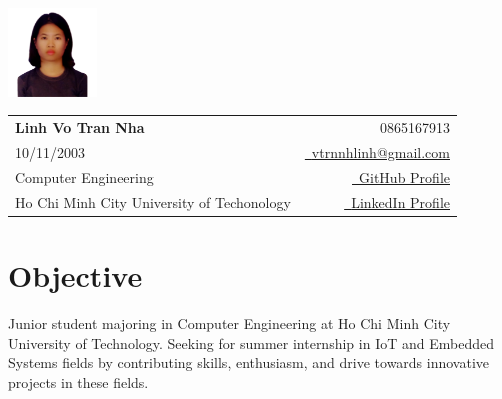 \documentclass[a4paper,11pt]{article}
\makeatletter
\newcommand{\name}{Linh Vo Tran Nha} %
\newcommand{\phone}{0865167913} %
\newcommand{\emailb}{vtrnnhlinh@gmail.com} %
\newcommand{\dob}{10/11/2003} %
\makeatother
\begin{document}
\selectfont


\parbox{2.35cm}{%
  \includegraphics[width=2.35cm,clip]{avatar.png}
}
\parbox{\dimexpr\linewidth-2.8cm\relax}{
  \begin{tabularx}{\linewidth}{L r}                                                                                                                                                   \\
    \textbf{\Large \name}                        & {\raisebox{0.0\height}{\footnotesize \faPhone}\ \phone}                                                              \\
    \dob                                         & \href{mailto:\emailb}{\raisebox{0.0\height}{\footnotesize \faEnvelope}\ {\emailb}}                                   \\
    {Computer Engineering}                       & \href{https://github.com/vtrnnhlinh}{\raisebox{0.0\height}{\footnotesize \faGithub}\ {GitHub Profile}}               \\
    {Ho Chi Minh City University of Techonology} & \href{https://www.linkedin.com/in/vtrnnhlinh/}{\raisebox{0.0\height}{\footnotesize \faLinkedin}\ {LinkedIn Profile}}
  \end{tabularx}
}

\section{\textbf{Objective}}
\begin{itemize}[leftmargin=0.05in, label={}]
  \small{\item{
                {Junior student majoring in Computer Engineering at Ho Chi Minh City University of Technology. Seeking for summer internship in IoT and Embedded Systems fields by contributing skills, enthusiasm, and drive towards innovative projects in these fields.} \\
          }}
\end{itemize}


\end{document}
